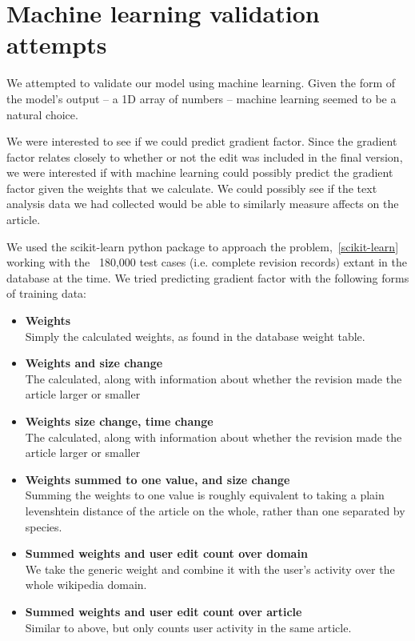\section{Machine learning validation attempts}
\label{mlisbad}
We attempted to validate our model using machine learning. Given the
form of the model's output -- a 1D array of numbers -- machine
learning seemed to be a natural choice.

We were interested to see if we could predict gradient factor. Since
the gradient factor relates closely to whether or not the edit was
included in the final version, we were interested if with machine
learning could possibly predict the gradient factor given the weights
that we calculate. We could possibly see if the text analysis data we
had collected would be able to similarly measure affects on the
article.

We used the scikit-learn python package to approach the
problem,~\ref{scikit-learn} working with the ~180,000 test cases (i.e.
complete revision records) extant in the database at the time. We
tried predicting gradient factor with the following forms of training
data:

\begin{itemize}
  \item \textbf{Weights}\\
    Simply the calculated weights, as found in the database weight table. 

  \item \textbf{Weights and size change}\\
    The calculated, along with information about whether the revision
    made the article larger or smaller

  \item \textbf{Weights size change, time change}\\
    The calculated, along with information about whether the revision
    made the article larger or smaller

  \item \textbf{Weights summed to one value, and size change}\\
    Summing the weights to one value is roughly equivalent to taking a
    plain levenshtein distance of the article on the whole, rather
    than one separated by species.
    
  \item \textbf{Summed weights and user edit count over
    domain}\\ We take the generic weight and combine it with the
    user's activity over the whole wikipedia domain.
    
  \item \textbf{Summed weights and user edit count over
    article}\\ Similar to above, but only counts user activity in the
    same article.

\end{itemize}

